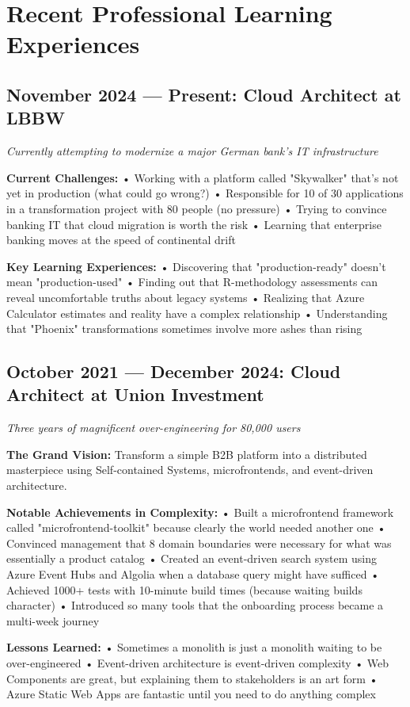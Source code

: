 \documentclass[10pt,a4paper]{article}
\begin{document}
\section{Recent Professional Learning Experiences}

\subsection{November 2024 — Present: Cloud Architect at LBBW}
\textit{Currently attempting to modernize a major German bank's IT infrastructure}

\textbf{Current Challenges:}
• Working with a platform called "Skywalker" that's not yet in production (what could go wrong?)
• Responsible for 10 of 30 applications in a transformation project with 80 people (no pressure)
• Trying to convince banking IT that cloud migration is worth the risk
• Learning that enterprise banking moves at the speed of continental drift

\textbf{Key Learning Experiences:}
• Discovering that "production-ready" doesn't mean "production-used"
• Finding out that R-methodology assessments can reveal uncomfortable truths about legacy systems
• Realizing that Azure Calculator estimates and reality have a complex relationship
• Understanding that "Phoenix" transformations sometimes involve more ashes than rising

\subsection{October 2021 — December 2024: Cloud Architect at Union Investment}
\textit{Three years of magnificent over-engineering for 80,000 users}

\textbf{The Grand Vision:} Transform a simple B2B platform into a distributed masterpiece using Self-contained Systems, microfrontends, and event-driven architecture.

\textbf{Notable Achievements in Complexity:}
• Built a microfrontend framework called "microfrontend-toolkit" because clearly the world needed another one
• Convinced management that 8 domain boundaries were necessary for what was essentially a product catalog
• Created an event-driven search system using Azure Event Hubs and Algolia when a database query might have sufficed
• Achieved 1000+ tests with 10-minute build times (because waiting builds character)
• Introduced so many tools that the onboarding process became a multi-week journey

\textbf{Lessons Learned:}
• Sometimes a monolith is just a monolith waiting to be over-engineered
• Event-driven architecture is event-driven complexity
• Web Components are great, but explaining them to stakeholders is an art form
• Azure Static Web Apps are fantastic until you need to do anything complex
\end{document}
